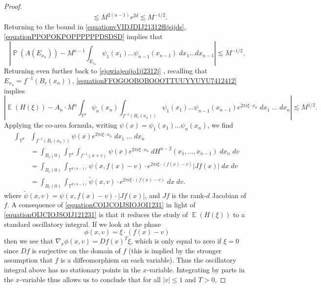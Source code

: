 \documentclass[dvipsnames,letterpaper,12pt]{article}
\numberwithin{equation}{section}
\DeclareMathOperator{\TT}{\mathbb{T}}
\numberwithin{theorem}{section}
\DeclareMathOperator{\EE}{\mathbb{E}}
\DeclareMathOperator{\PP}{\mathbb{P}}
\begin{document}
\begin{proof}
\begin{equation}
\begin{split}
        &\lesssim M^{2(n-1)} r^{2d} \lesssim M^{-1/2}.
    \end{split}
    \end{equation}
    Returning to the bound in \eqref{equationvVIDJDIJ21312ffijsijds}, \eqref{equationPPOPOKPOPPPPPPDSDSD} implies that
    \begin{equation} \label{equationFFOGOOBOBOOOTTUUYYUYU7412412}
        \left| \PP(A(E_{x_n})) - M^{n-1} \int_{E_{x_n}} \psi_1(x_1) \dots \psi_{n-1}(x_{n-1})\; dx_1 \dots dx_{n-1} \right| \lesssim M^{-1/2}.
    \end{equation}
    Returning even further back to \eqref{ejowiajeoijo1ij2312j}%
    , recalling that $E_{x_n} = f^{-1}(B_r(x_n))$, \eqref{equationFFOGOOBOBOOOTTUUYYUYU7412412} implies
    \begin{equation} \label{equationOIJCIOJSOIJ121231}
        \left| \EE(H(\xi)) - A_n \cdot M^n \int_{\TT^d} \psi_n(x_n) \int_{f^{-1}(B_r(x_n))} \psi_1(x_1) \dots \psi_{n-1}(x_{n-1}) e^{2 \pi i \xi \cdot x_n}\; dx_1\; \dots\; dx_n \right| \lesssim M^{1/2}.
    \end{equation}
    Applying the co-area formula, writing $\psi(x) = \psi_1(x_1) \dots \psi_n(x_n)$, we find
    \begin{equation} \label{equationCOIJCOIJSIOJOI1231}
    \begin{split}
        \int_{\TT^d} & \int_{f^{-1}(B_r(x_n))} \psi(x) e^{2 \pi i \xi \cdot x_n}\; dx_1\; \dots\; dx_n\\
        &= \int_{B_r(0)} \int_{\TT^d} \int_{f^{-1}(x + v)} \psi(x) e^{2 \pi i \xi \cdot x_n}\; dH^{n-2}(x_1,\dots,x_{n-1})\; dx_n\; dv\\
        &= \int_{B_r(0)} \int_{\TT^{d(n-1)}} \psi(x,f(x) - v) \cdot e^{2 \pi i \xi \cdot (f(x) - v)} |Jf(x)|\; dx\; dv\\
        &= \int_{B_r(0)} \int_{\TT^{d(n-1)}} \tilde{\psi}(x,v) \cdot e^{2 \pi i \xi \cdot (f(x) - v)}\; dx\; dv.
    \end{split}
    \end{equation}
    where $\tilde{\psi}(x,v) = \psi(x,f(x) - v) \cdot |Jf(x)|$, and $Jf$ is the rank-$d$ Jacobian of $f$. A consequence of \eqref{equationCOIJCOIJSIOJOI1231} in light of \eqref{equationOIJCIOJSOIJ121231} is that it reduces the study of $\EE(H(\xi))$ to a standard oscillatory integral. If we look at the phase
    \[ \phi(x,v) = \xi \cdot (f(x) - v) \]
    then we see that $\nabla_x \phi(x,v) = Df(x)^T \xi$, which is only equal to zero if $\xi = 0$ since $Df$ is surjective on the domain of $f$ (this is implied by the stronger assumption that $f$ is a diffeomorphism on each variable). Thus the oscillatory integral above has no stationary points in the $x$-variable. Integrating by parts in the $x$-variable thus allows us to conclude that for all $|v| \leq 1$ and $T > 0$,

\end{proof}
\end{document}
